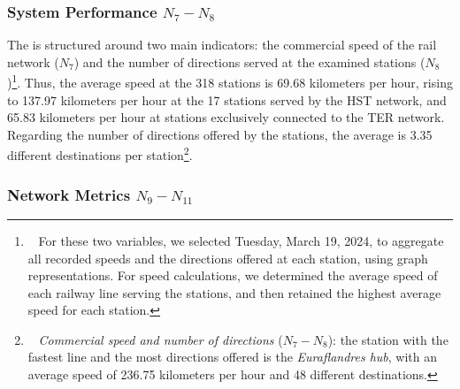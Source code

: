 \begin{refsegment}
\subsubsection*{System Performance \(N_{7} - N_{8}\)
    \label{chap6:indicateurs-node-performance}
    }

The  is structured around two main indicators: the commercial speed of the rail network (\(N_{7}\)) and the number of directions served at the examined stations (\(N_{8}\))\footnote{~
    For these two variables, we selected Tuesday, March 19, 2024, to aggregate all recorded speeds and the directions offered at each station, using graph representations. For speed calculations, we determined the average speed of each railway line serving the stations, and then retained the highest average speed for each station.
}. Thus, the average speed at the 318 stations is 69.68 kilometers per hour, rising to 137.97 kilometers per hour at the 17 stations served by the \acrshort{HST} network, and 65.83 kilometers per hour at stations exclusively connected to the \acrshort{TER} network. Regarding the number of directions offered by the stations, the average is 3.35 different destinations per station\footnote{~
    \textsl{Commercial speed and number of directions} (\(N_{7} - N_{8}\)): the station with the fastest line and the most directions offered is the \textsl{Euraflandres hub}, with an average speed of 236.75 kilometers per hour and 48 different destinations.
}.%

\subsubsection*{Network Metrics \(N_{9} - N_{11}\)
    \label{chap6:indicateurs-node-metrique}
    }


\end{refsegment}
